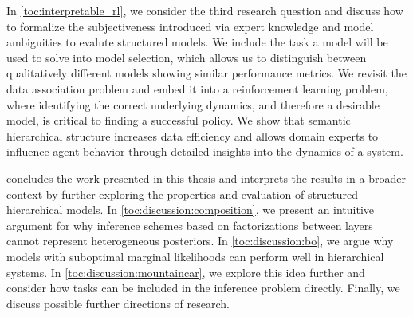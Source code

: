 In \cref{toc:interpretable_rl}, we consider the third research question and discuss how to formalize the subjectiveness introduced via expert knowledge and model ambiguities to evalute structured models.
We include the task a model will be used to solve into model selection, which allows us to distinguish between qualitatively different models showing similar performance metrics.
We revisit the data association problem and embed it into a reinforcement learning problem, where identifying the correct underlying dynamics, and therefore a desirable model, is critical to finding a successful policy.
We show that semantic hierarchical structure increases data efficiency and allows domain experts to influence agent behavior through detailed insights into the dynamics of a system.

 concludes the work presented in this thesis and interprets the results in a broader context by further exploring the properties and evaluation of structured hierarchical models.
In \cref{toc:discussion:composition}, we present an intuitive argument for why inference schemes based on factorizations between layers cannot represent heterogeneous posteriors.
In \cref{toc:discussion:bo}, we argue why models with suboptimal marginal likelihoods can perform well in hierarchical systems.
In \cref{toc:discussion:mountaincar}, we explore this idea further and consider how tasks can be included in the inference problem directly.
Finally, we discuss possible further directions of research.
